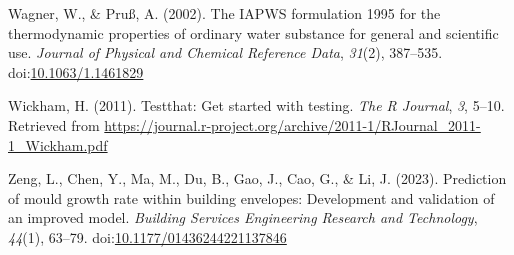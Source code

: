 \documentclass[
]{article}
\newlength{\cslhangindent}
\newenvironment{CSLReferences}[2] %
 {\begin{list}{}{%
  \setlength{\itemindent}{0pt}
  \setlength{\leftmargin}{0pt}
  \setlength{\parsep}{0pt}
  \ifodd #1
   \setlength{\leftmargin}{\cslhangindent}
   \setlength{\itemindent}{-1\cslhangindent}
  \fi
  \setlength{\itemsep}{#2\baselineskip}}}
 {\end{list}}
\begin{document}
\begin{CSLReferences}{1}{0}
Wagner, W., \& Pruß, A. (2002). The IAPWS formulation 1995 for the
thermodynamic properties of ordinary water substance for general and
scientific use. \emph{Journal of Physical and Chemical Reference Data},
\emph{31}(2), 387--535.
doi:\href{https://doi.org/10.1063/1.1461829}{10.1063/1.1461829}

Wickham, H. (2011). Testthat: Get started with testing. \emph{The R
Journal}, \emph{3}, 5--10. Retrieved from
\url{https://journal.r-project.org/archive/2011-1/RJournal_2011-1_Wickham.pdf}

Zeng, L., Chen, Y., Ma, M., Du, B., Gao, J., Cao, G., \& Li, J. (2023).
Prediction of mould growth rate within building envelopes: Development
and validation of an improved model. \emph{Building Services Engineering
Research and Technology}, \emph{44}(1), 63--79.
doi:\href{https://doi.org/10.1177/01436244221137846}{10.1177/01436244221137846}

\end{CSLReferences}
\end{document}
